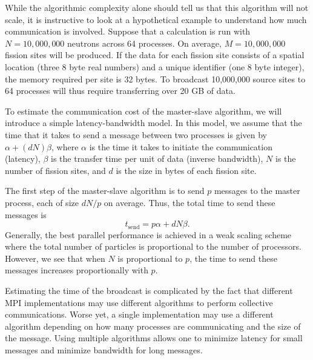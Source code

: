 While the algorithmic complexity alone should tell us that this algorithm will
not scale, it is instructive to look at a hypothetical example to understand how
much communication is involved. Suppose that a calculation is run with $N =
10,000,000$ neutrons across 64 processes. On average, $M = 10,000,000$ fission
sites will be produced. If the data for each fission site consists of a spatial
location (three 8 byte real numbers) and a unique identifier (one 8 byte
integer), the memory required per site is 32 bytes. To broadcast 10,000,000
source sites to 64 processes will thus require transferring over 20 GB of data.

To estimate the communication cost of the master-slave algorithm, we will
introduce a simple latency-bandwidth model. In this model, we assume that the
time that it takes to send a message between two processes is given by $\alpha +
(dN)\beta$, where $\alpha$ is the time it takes to initiate the communication
(latency), $\beta$ is the transfer time per unit of data (inverse bandwidth),
$N$ is the number of fission sites, and $d$ is the size in bytes of each fission
site.

The first step of the master-slave algorithm is to send $p$ messages to the
master process, each of size $dN/p$ on average. Thus, the total time to send
these messages is
\begin{equation}
  \label{eq:t-send}
  t_{\text{send}} = p\alpha + dN\beta.
\end{equation}
Generally, the best parallel performance is achieved in a weak scaling scheme
where the total number of particles is proportional to the number of
processors. However, we see that when $N$ is proportional to $p$, the time to
send these messages increases proportionally with $p$.

Estimating the time of the broadcast is complicated by the fact that different
MPI implementations may use different algorithms to perform collective
communications. Worse yet, a single implementation may use a different algorithm
depending on how many processes are communicating and the size of the
message. Using multiple algorithms allows one to minimize latency for small
messages and minimize bandwidth for long messages.

